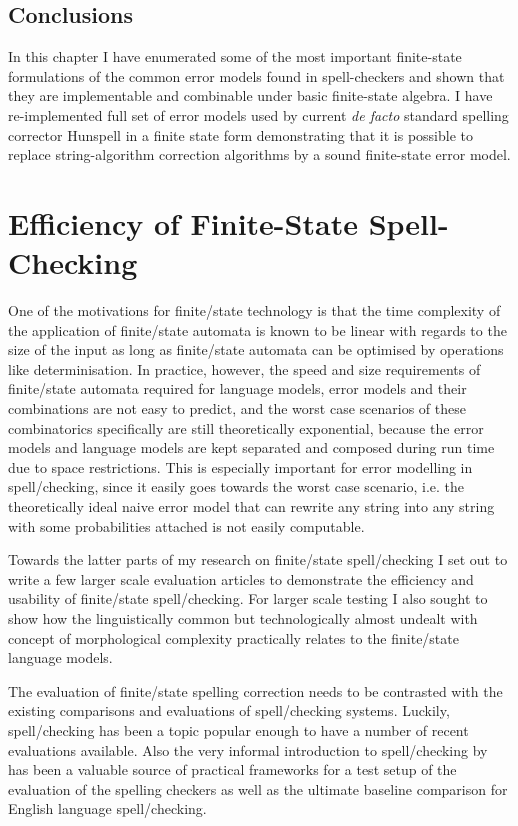 \documentclass[officiallayout]{unihelcompling}
\begin{document}
\section{Conclusions}

In this chapter I have enumerated some of the most important finite-state
formulations of the common error models found in spell-checkers and shown that
they are implementable and combinable under basic finite-state algebra. I have
re-implemented full set of error models used by current \emph{de facto}
standard spelling corrector Hunspell in a finite state form demonstrating that
it is possible to replace string-algorithm correction algorithms by a sound
finite-state error model.

\chapter{Efficiency of Finite-State Spell-Checking}
\label{chap:efficiency}

One of the motivations for finite\-/state technology is that the time
complexity of the application of finite\-/state automata is known to be linear
with regards to the size of the input as long as finite\-/state automata can be
optimised by operations like determinisation. In practice, however, the speed
and size requirements of finite\-/state automata required for language models,
error models and their combinations are not easy to predict, and the worst case
scenarios of these combinatorics specifically are still theoretically
exponential, because the error models and language models are kept separated
and composed during run time due to space restrictions. This is especially
important for error modelling in spell\-/checking, since it easily goes towards
the worst case scenario, i.e. the theoretically ideal naive error model that
can rewrite any string into any string with some probabilities attached is not
easily computable.

Towards the latter parts of my research on finite\-/state spell\-/checking I
set out to write a few larger scale evaluation articles to demonstrate the
efficiency and usability of finite\-/state spell\-/checking. For larger scale
testing I also sought to show how the linguistically common but technologically
almost undealt with concept of morphological complexity practically relates to
the finite\-/state language models.

The evaluation of finite\-/state spelling correction needs to be contrasted
with the existing comparisons and evaluations of spell\-/checking systems.
Luckily, spell\-/checking has been a topic popular enough to have a number
of recent evaluations available.  Also the very informal introduction to
spell\-/checking by~\citet{norvig2010howto} has been a valuable source of
practical frameworks for a test setup of the evaluation of the spelling
checkers as well as the ultimate baseline comparison for English language
spell\-/checking.
\end{document}
